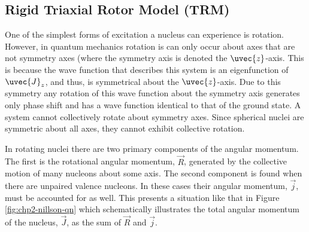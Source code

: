 \subsection{Rigid Triaxial Rotor Model (TRM)}
\label{ssec:models-triaxial-rotor}
One of the simplest forms of excitation a nucleus can experience is rotation. However, in quantum mechanics rotation is can only occur about axes that are not symmetry axes (where the symmetry axis is denoted the $\uvec{z}$-axis. This is because the wave function that describes this system is an eigenfunction of $\uvec{J}_z$, and thus, is symmetrical about the $\uvec{z}$-axis. Due to this symmetry any rotation of this wave function about the symmetry axis generates only phase shift and has a wave function identical to that of the ground state. A system cannot collectively rotate about symmetry axes. Since spherical nuclei are symmetric about all axes, they cannot exhibit collective rotation.

In rotating nuclei there are two primary components of the angular momentum. The first is the rotational angular momentum, $\vec{R}$, generated by the collective motion of many nucleons about some axis. The second component is found when there are unpaired valence nucleons. In these cases their angular momentum, $\vec{j}$, must be accounted for as well. This presents a situation like that in Figure \ref{fig:chp2-nillson-qn} which schematically illustrates the total angular momentum of the nucleus, $\vec{J}$, as the sum of $\vec{R}$ and $\vec{j}$.

